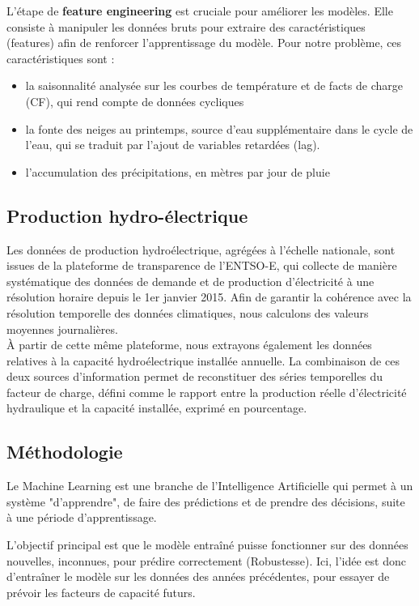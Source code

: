 \documentclass{article}
\theoremstyle{nopointbreak}
\theoremstyle{nobrkbold}
\begin{document}
L'étape de \textbf{feature engineering} est cruciale pour améliorer les modèles. Elle consiste à manipuler les données bruts pour extraire des caractéristiques (features) afin de renforcer l'apprentissage du modèle. Pour notre problème, ces caractéristiques sont : 
\begin{itemize}
    \item la saisonnalité analysée sur les courbes de température et de facts de charge (CF), qui rend compte de données cycliques 
    \item la fonte des neiges au printemps,  source d'eau supplémentaire dans le cycle de l'eau, qui se traduit par l'ajout de variables retardées (lag).
    \item l'accumulation des précipitations, en mètres par jour de pluie

\end{itemize} 


\subsection{Production hydro-électrique}
Les données de production hydroélectrique, agrégées à l’échelle nationale, sont issues de la plateforme de transparence de l’ENTSO-E, qui collecte de manière systématique des données de demande et de production d’électricité à une résolution horaire depuis le 1er janvier 2015. Afin de garantir la cohérence avec la résolution temporelle des données climatiques, nous calculons des valeurs moyennes journalières.\\

À partir de cette même plateforme, nous extrayons également les données relatives à la capacité hydroélectrique installée annuelle. La combinaison de ces deux sources d’information permet de reconstituer des séries temporelles du facteur de charge, défini comme le rapport entre la production réelle d’électricité hydraulique et la capacité installée, exprimé en pourcentage.\\


\subsection{Méthodologie}

Le Machine Learning est une branche de l'Intelligence Artificielle qui permet à un système "d'apprendre", de faire des prédictions et de prendre des décisions, suite à une période d'apprentissage. 

L'objectif principal est que le modèle entraîné puisse fonctionner sur des données nouvelles, inconnues, pour prédire correctement (Robustesse). Ici, l'idée est donc d'entraîner le modèle sur les données des années précédentes, pour essayer de prévoir les facteurs de capacité futurs. \\
\end{document}

